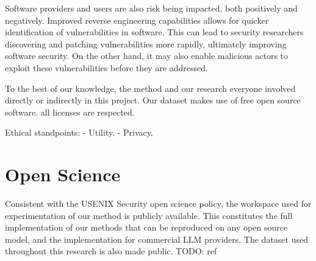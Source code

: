 Software providers and users are also risk being impacted, both positively and negatively. Improved reverse engineering
capabilities allows for quicker identification of vulnerabilities in software. This can lead to security researchers
discovering and patching vulnerabilities more rapidly, ultimately improving software security. On the other hand, it may
also enable malicious actors to exploit these vulnerabilities before they are addressed. 

To the best of our knowledge, the method and our research everyone involved directly or indirectly in this project.
Our dataset makes use of free open source software. all licenses are respected.

Ethical standpoints:
- Utility.
- Privacy.

\section*{Open Science}

Consistent with the USENIX Security open science policy, the workspace used for experimentation
of our method is publicly available. This constitutes the full implementation of our methods that can be reproduced on
any open source model, and the implementation for commercial LLM providers. The dataset used throughout this research
is also made public. TODO: ref

\cleardoublepage



\appendix

